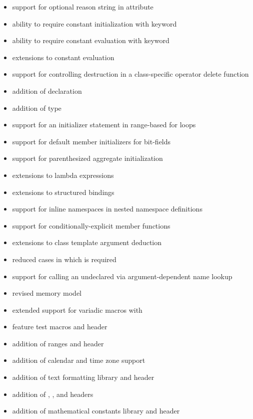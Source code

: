 \begin{itemize}
\item support for optional reason string in \tcode{[[nodiscard]]} attribute
\item ability to require constant initialization with  keyword
\item ability to require constant evaluation with  keyword
\item extensions to constant evaluation
\item support for controlling destruction in a class-specific operator delete function
\item addition of   declaration
\item addition of  type
\item support for an initializer statement in range-based for loops
\item support for default member initializers for bit-fields
\item support for parenthesized aggregate initialization
\item extensions to lambda expressions
\item extensions to structured bindings
\item support for inline namespaces in nested namespace definitions
\item support for conditionally-explicit member functions
\item extensions to class template argument deduction
\item reduced cases in which  is required
\item support for calling an undeclared 
via argument-dependent name lookup
\item revised memory model
\item extended support for variadic macros with 
\item feature test macros and  header
\item addition of ranges and  header
\item addition of calendar and time zone support
\item addition of text formatting library and  header
\item addition of , , and  headers
\item addition of mathematical constants library and  header

\end{itemize}
